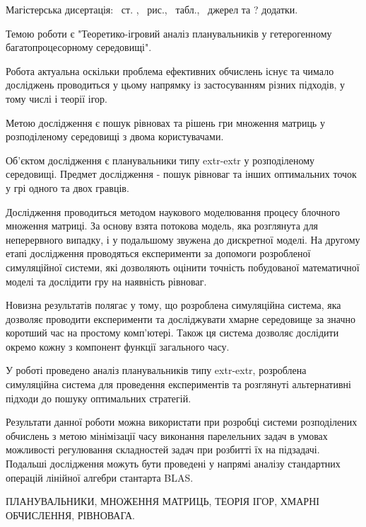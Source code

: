 
Магістерська дисертація: \pageref*{MyLastPage}~ст. , \totfig~рис.,  \tottab~табл., ~джерел та ? додатки.

Темою роботи є "Теоретико-ігровий аналіз планувальників у гетерогенному багатопроцесорному середовищі".

Робота актуальна оскільки проблема ефективних обчислень існує та чимало досліджень проводиться у цьому напрямку із застосуванням різних підходів, у тому числі і теорії ігор.

Метою дослідження є пошук рівновах та рішень гри множення матриць у розподіленому середовищі з двома користувачами.

Об'єктом дослідження є планувальники типу extr-extr у розподіленому середовищі. Предмет дослідження - пошук рівноваг та інших оптимальних точок у грі одного та двох гравців.

Дослідження проводиться методом наукового моделювання процесу блочного множення матриці. За основу взята потокова модель, яка розглянута для неперервного випадку, і у подальшому звужена до дискретної моделі. На другому етапі дослідження проводяться експерименти за допомоги розробленої симуляційної системи, які дозволяють оцінити точність побудованої математичної моделі та дослідити гру на наявність рівноваг.

Новизна результатів полягає у тому, що розроблена симуляційна система, яка дозволяє проводити експерименти та досліджувати хмарне середовище за значно коротший час на простому комп'ютері. Також ця система дозволяє дослідити окремо кожну з компонент функції загального часу.

У роботі проведено аналіз планувальників типу extr-extr, розроблена симуляційна система для проведення експериментів та розглянуті альтернативні підходи до пошуку оптимальних стратегій.

Результати данної роботи можна використати при розробці системи розподілених обчислень з метою мінімізації часу виконання парелельних задач в умовах можливості регулювання складностей задач при розбитті їх на підзадачі. Подальші дослідження можуть бути проведені у напрямі аналізу стандартних операцій лінійної алгебри стантарта BLAS.

\MakeUppercase{планувальники, множення матриць, теорія ігор, хмарні обчислення, рівновага.}
